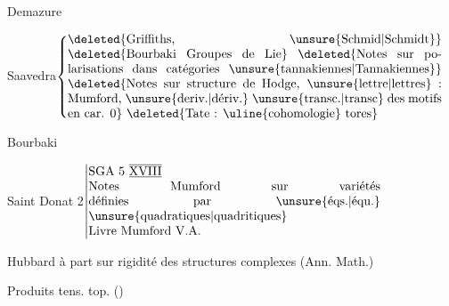 








Demazure\qquad {}

Saavedra\quad \(\left\{\vcenter{\hbox{\begin{minipage}{.87\linewidth}

\deleted{Griffiths, \unsure{Schmid|Schmidt}}

\deleted{Bourbaki Groupes de Lie}

\deleted{Notes sur polarisations dans catégories \unsure{tannakiennes|Tannakiennes}}

\deleted{Notes sur structure de Hodge, \unsure{lettre|lettres} : Mumford, \unsure{deriv.|dériv.} \unsure{transc.|transc} des motifs en car. 0}

\deleted{Tate : \uline{cohomologie} tores}

\end{minipage}}}\right.\)

\qquad Bourbaki 





Saint Donat 2\qquad \(\left\vert\begin{array}{@{}p{.68\linewidth}@{}}SGA 5 $\overline{\underline{\mathrm{XVIII}}}$\\Notes Mumford sur variétés définies par \unsure{éqs.|équ.} \unsure{quadratiques|quadritiques}\\Livre Mumford V.A.\end{array}\right.\)

Hubbard\qquad {} à part sur rigidité des structures complexes (Ann. Math.)

\qquad Produits tens. top. ()


\clearpage
